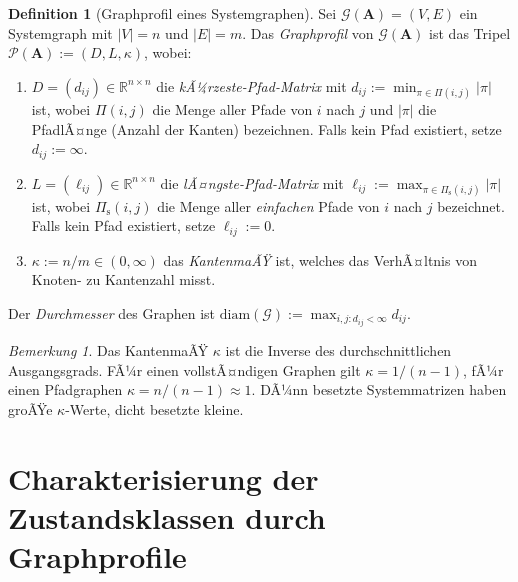 ﻿\documentclass[12pt, a4paper, titlepage]{report}
\theoremstyle{definition}
\newtheorem{definition}[theorem]{Definition}
\theoremstyle{remark}
\newtheorem{remark}[theorem]{Bemerkung}
\newcommand{\R}{\mathbb{R}}
\newcommand{\vA}{\bm{A}}
\begin{document}
\begin{definition}[Graphprofil eines Systemgraphen]
\label{def:graphprofil}
Sei $\mathcal{G}(\vA) = (V, E)$ ein Systemgraph mit $|V| = n$ und $|E| = m$.
Das \emph{Graphprofil} von $\mathcal{G}(\vA)$ ist das Tripel
$\mathcal{P}(\vA) := (D, L, \kappa)$, wobei:
\begin{enumerate}[label=(\roman*)]
  \item $D = (d_{ij}) \in \R^{n \times n}$ die \emph{kÃ¼rzeste-Pfad-Matrix} mit
    $d_{ij} := \min_{\pi \in \Pi(i,j)} |\pi|$ ist, wobei $\Pi(i,j)$ die Menge aller
    Pfade von $i$ nach $j$ und $|\pi|$ die PfadlÃ¤nge (Anzahl der Kanten) bezeichnen.
    Falls kein Pfad existiert, setze $d_{ij} := \infty$.
  \item $L = (\ell_{ij}) \in \R^{n \times n}$ die \emph{lÃ¤ngste-Pfad-Matrix} mit
    $\ell_{ij} := \max_{\pi \in \Pi_{\mathrm{s}}(i,j)} |\pi|$ ist, wobei
    $\Pi_{\mathrm{s}}(i,j)$ die Menge aller \emph{einfachen} Pfade von $i$ nach $j$
    bezeichnet. Falls kein Pfad existiert, setze $\ell_{ij} := 0$.
  \item $\kappa := n / m \in (0, \infty)$ das \emph{KantenmaÃŸ} ist, welches das
    VerhÃ¤ltnis von Knoten- zu Kantenzahl misst.
\end{enumerate}
Der \emph{Durchmesser} des Graphen ist $\mathrm{diam}(\mathcal{G}) :=
\max_{i,j : d_{ij}<\infty} d_{ij}$.
\end{definition}

\begin{remark}
Das KantenmaÃŸ $\kappa$ ist die Inverse des durchschnittlichen Ausgangsgrads.
FÃ¼r einen vollstÃ¤ndigen Graphen gilt $\kappa = 1/(n-1)$, fÃ¼r einen Pfadgraphen
$\kappa = n/(n-1) \approx 1$. DÃ¼nn besetzte Systemmatrizen haben groÃŸe $\kappa$-Werte,
dicht besetzte kleine.
\end{remark}

\section{Charakterisierung der Zustandsklassen durch Graphprofile}
\end{document}
